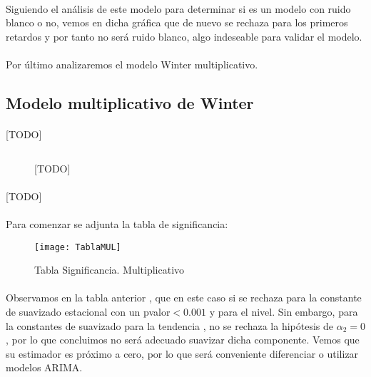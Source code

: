 \documentclass[a4paper, spanish]{article}
\begin{document}
      \paragraph{}
      Siguiendo el análisis de este modelo para determinar si es un modelo con ruido blanco o no, vemos en dicha gráfica que de nuevo se rechaza para los primeros retardos y por tanto no será ruido blanco, algo indeseable para validar el modelo.

      \paragraph{}
      Por último analizaremos el modelo Winter multiplicativo.

    \subsection{Modelo multiplicativo de Winter}

      \paragraph{}
      [TODO]

      \begin{figure}[h!]
        \centering
        \inputminted{SAS}{./res/code/b-01-esm-3.sas}
        \caption{[TODO]}
        \label{code:b_esm_3}
      \end{figure}

      \paragraph{}
      [TODO]

      \paragraph{}
      Para comenzar se adjunta la tabla de significancia:

      \begin{figure}[h!]
        \centering
        \texttt{[image: TablaMUL]}
        \caption{Tabla Significancia. Multiplicativo}
        \label{}
      \end{figure}

      \paragraph{}
      Observamos en la tabla anterior , que en este caso si se rechaza para la constante de suavizado estacional con un pvalor$ <0.001$ y para el nivel. Sin embargo, para la constantes de suavizado para la tendencia , no se rechaza la hipótesis de $\alpha_2 =0$, por lo que concluimos no será adecuado suavizar dicha componente. Vemos que su estimador es próximo a cero, por lo que será conveniente diferenciar o utilizar modelos ARIMA.
\end{document}
